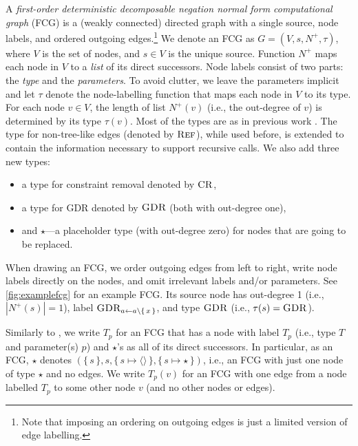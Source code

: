 A \emph{first-order deterministic decomposable negation normal form
  computational graph} (FCG) is a (weakly connected) directed graph with a
single source, node labels, and ordered outgoing edges.\footnote{Note that
  imposing an ordering on outgoing edges is just a limited version of edge
  labelling.} We denote an FCG as $G = (V, s, N^+, \tau)$, where $V$ is the set
of nodes, and $s \in V$ is the unique source. Function $N^+$ maps each node in
$V$ to a \emph{list} of its direct successors. Node labels consist of two parts:
the \emph{type} and the \emph{parameters}. To avoid clutter, we leave the
parameters implicit and let $\tau$ denote the node-labelling function that maps
each node in $V$ to its type. For each node $v \in V$, the length of list
$N^+(v)$ (i.e., the out-degree of $v$) is determined by its type $\tau(v)$. Most
of the types are as in previous work
\citep{DBLP:conf/nips/Broeck11,DBLP:conf/ijcai/BroeckTMDR11}. The type for
non-tree-like edges (denoted by $\operatorname{\textsc{Ref}}$), while used before, is extended to
contain the information necessary to support recursive calls. We also add three
new types:
\begin{itemize}
  \item a type for constraint removal denoted by $\operatorname{\textsc{CR}}$,
  \item a type for GDR denoted by $\operatorname{\textsc{GDR}}$ (both with out-degree one),
  \item and $\star$---a placeholder type (with out-degree zero) for nodes that
        are going to be replaced.
\end{itemize}
When drawing an FCG, we order outgoing edges from left to right, write node
labels directly on the nodes, and omit irrelevant labels and/or parameters. See
\cref{fig:examplefcg} for an example FCG\@. Its source node has out-degree 1
(i.e., $|N^+(s)| = 1$), label $\operatorname{\textsc{GDR}}_{a \gets a \setminus \{\, x \,\}}$, and type
$\operatorname{\textsc{GDR}}$ (i.e., $\tau(s) = \operatorname{\textsc{GDR}}$).

Similarly to \citet{DBLP:conf/ijcai/BroeckTMDR11}, we write $T_p$ for an FCG
that has a node with label $T_p$ (i.e., type $T$ and parameter(s) $p$) and
$\star$'s as all of its direct successors. In particular, as an FCG, $\star$
denotes
$(\{\, s \,\}, s, \{\, s \mapsto \langle\rangle \,\}, \{\, s \mapsto \star \,\})$,
i.e., an FCG with just one node of type $\star$ and no edges. We write $T_p(v)$
for an FCG with one edge from a node labelled $T_{p}$ to some other node $v$
(and no other nodes or edges).

